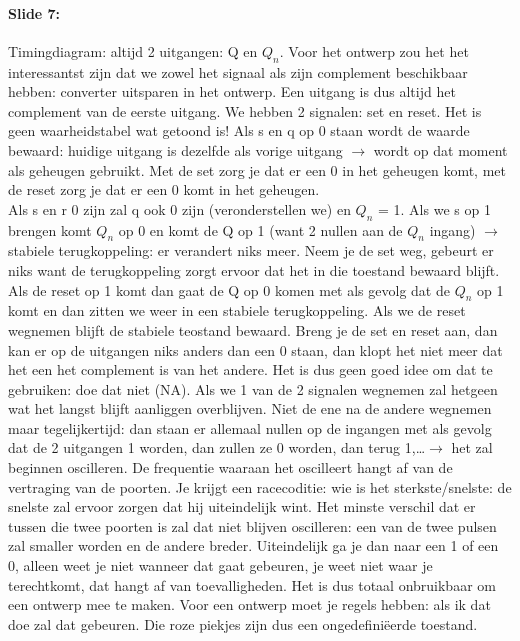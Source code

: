 \documentclass[10pt,a4paper]{book}
\begin{document}
\paragraph{Slide 7:} Timingdiagram: altijd 2 uitgangen: Q en $Q_n$. Voor het ontwerp zou het het interessantst zijn dat we zowel het signaal als zijn complement beschikbaar hebben: converter uitsparen in het ontwerp. Een uitgang is dus altijd het complement van de eerste uitgang. We hebben 2 signalen: set en reset. Het is geen waarheidstabel wat getoond is! Als s en q op 0 staan wordt de waarde bewaard: huidige uitgang is dezelfde als vorige uitgang $\rightarrow$ wordt op dat moment als geheugen gebruikt. Met de set zorg je dat er een 0 in het geheugen komt, met de reset zorg je dat er een 0 komt in het geheugen.\\
Als s en r 0 zijn zal q ook 0 zijn (veronderstellen we) en $Q_n$ = 1. Als we s op 1 brengen komt $Q_n$ op 0 en komt de Q op 1 (want 2 nullen aan de $Q_n$ ingang) $\rightarrow$ stabiele terugkoppeling: er verandert niks meer. Neem je de set weg, gebeurt er niks want de terugkoppeling zorgt ervoor dat het in die toestand bewaard blijft. Als de reset op 1 komt dan gaat de Q op 0 komen met als gevolg dat de $Q_n$ op 1 komt en dan zitten we weer in een stabiele terugkoppeling. Als we de reset wegnemen blijft de stabiele teostand bewaard. Breng je de set en reset aan, dan kan er op de uitgangen niks anders dan een 0 staan, dan klopt het niet meer dat het een het complement is van het andere. Het is dus geen goed idee om dat te gebruiken: doe dat niet (NA). Als we 1 van de 2 signalen wegnemen zal hetgeen wat het langst blijft aanliggen overblijven. Niet de ene na de andere wegnemen maar tegelijkertijd: dan staan er allemaal nullen op de ingangen met als gevolg dat de 2 uitgangen 1 worden, dan zullen ze 0 worden, dan terug 1,\ldots $\rightarrow$ het zal beginnen oscilleren. De frequentie waaraan het oscilleert hangt af van de vertraging van de poorten. Je krijgt een racecoditie: wie is het sterkste/snelste: de snelste zal ervoor zorgen dat hij uiteindelijk wint. Het minste verschil dat er tussen die twee poorten is zal dat niet blijven oscilleren: een van de twee pulsen zal smaller worden en de andere breder. Uiteindelijk ga je dan naar een 1 of een 0, alleen weet je niet wanneer dat gaat gebeuren, je weet niet waar je terechtkomt, dat hangt af van toevalligheden. Het is dus totaal onbruikbaar om een ontwerp mee te maken. Voor een ontwerp moet je regels hebben: als ik dat doe zal dat gebeuren. Die roze piekjes zijn dus een ongedefini\"eerde toestand.
\end{document}
